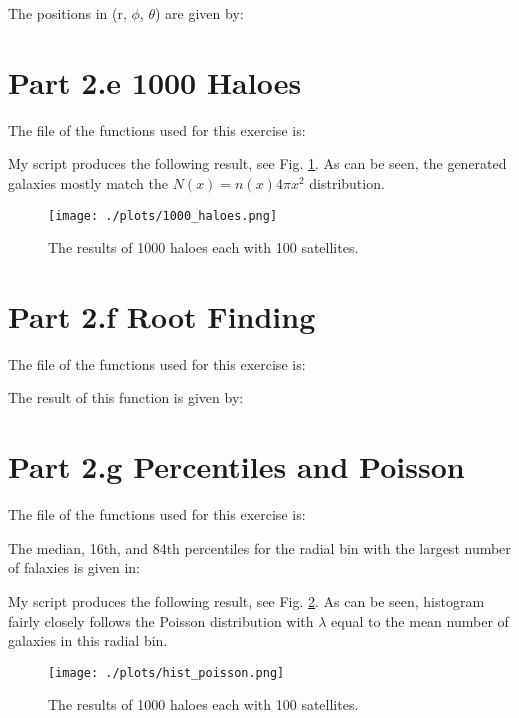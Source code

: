 The positions in (r, $\phi$, $\theta$) are given by:



\section{Part 2.e 1000 Haloes}

The file of the functions used for this exercise is:



My script produces the following result, see Fig. \ref{fig:1000_haloes}. As can be seen, the generated galaxies mostly match
the $N(x) = n(x)4\pi x^2$ distribution.

\begin{figure}[h!]
  \centering
  \texttt{[image: ./plots/1000\_haloes.png]}
  \caption{The results of 1000 haloes each with 100 satellites. }
  \label{fig:1000_haloes}
\end{figure}

\section{Part 2.f Root Finding}

The file of the functions used for this exercise is:



The result of this function is given by:



\section{Part 2.g Percentiles and Poisson}

The file of the functions used for this exercise is:



The median, 16th, and 84th percentiles for the radial bin with the largest number of falaxies is given in:



My script produces the following result, see Fig. \ref{fig:hist_poisson}. As can be seen, histogram fairly closely follows
the Poisson distribution with $\lambda$ equal to the mean number of galaxies in this radial bin.

\begin{figure}[h!]
  \centering
  \texttt{[image: ./plots/hist\_poisson.png]}
  \caption{The results of 1000 haloes each with 100 satellites. }
  \label{fig:hist_poisson}
\end{figure}

